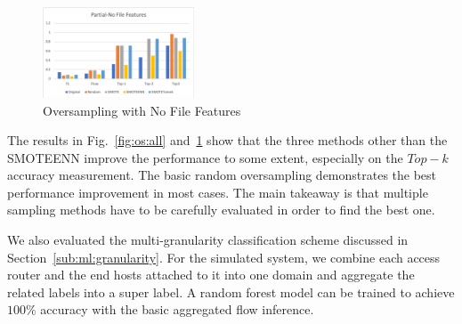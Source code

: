 \begin{figure}[!ht]
\begin{center}
\includegraphics[width=0.4\textwidth]{./figure/partial-nofile-oversampling}
\end{center}
\vspace{-0.1in}
\caption{Oversampling with No File Features}
\label{fig:os:nofile}
\vspace{-0.1in}
\end{figure}

The results in Fig.~\ref{fig:os:all} and~\ref{fig:os:nofile} show that the three methods other than the SMOTEENN improve the performance to some extent, especially on the $Top-k$ accuracy measurement. The basic random oversampling demonstrates the best performance improvement in most cases.  The main takeaway is that multiple sampling methods have to be carefully evaluated in order to find the best one.

We also evaluated the multi-granularity classification scheme discussed in Section~\ref{sub:ml:granularity}. For the simulated system, we combine each access router and the end hosts attached to it into one domain and aggregate the related labels into a super label. A random forest model can be trained to achieve $100\%$ accuracy with the basic aggregated flow inference.    
